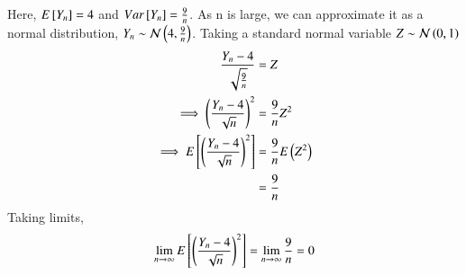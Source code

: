 \documentclass[journal,12pt,onecolumn]{IEEEtran}
\theoremstyle{remark}
\begin{document}
Here, $E{}\left[Y_n\right] = 4$ and $Var{}\left[Y_n\right] = \frac{9}{n}$. As n is large, we can approximate it as a normal distribution, $Y_n \sim \mathcal{N}\left(4, \frac{9}{n}\right)$.
Taking a standard normal variable $Z \sim \mathcal{N}\left(0, 1\right)$
\begin{align}
    \frac{Y_n - 4}{\sqrt{\frac{9}{n}}} &= Z\\
    \implies \left(\frac{Y_n - 4}{\sqrt{n}}\right)^2 &= \frac{9}{n} Z^2\\
    \implies E{}\left[\left(\frac{Y_n - 4}{\sqrt{n}}\right)^2\right] &= \frac{9}{n} E\left(Z^2\right)\\
    &= \frac{9}{n}
\end{align}
Taking limits,
\begin{align}
    \lim\limits_{n \to \infty} E{}\left[\left(\frac{Y_n - 4}{\sqrt{n}}\right)^2\right]
    = \lim\limits_{n \to \infty} \frac{9}{n} = 0
\end{align}
\end{document}
